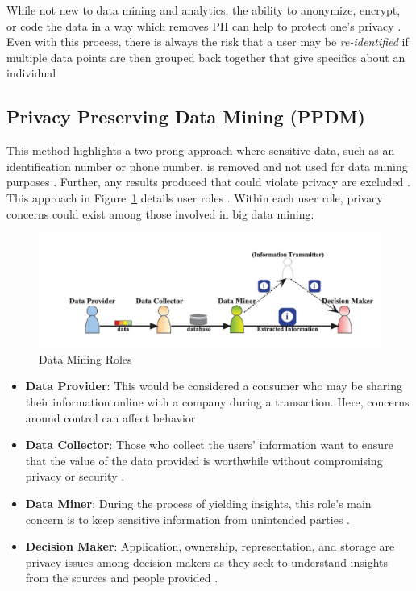 \documentclass[sigconf]{acmart}
\begin{document}
While not new to data mining and analytics, the ability to anonymize, encrypt, or code the data in a way which removes PII can help to protect one's privacy \cite{Tene2012}. Even with this process, there is always the risk that a user may be \textit{re-identified} if multiple data points are then grouped back together that give specifics about an individual \cite{Francis2014}

\subsection{Privacy Preserving Data Mining (PPDM)} 

This method highlights a two-prong approach where sensitive data, such as an identification number or phone number, is removed and not used for data mining purposes \cite{Xu2014}. Further, any results produced that could violate privacy are excluded \cite{Xu2014}. This approach in Figure~\ref{f:DataMiningRoles} details user roles \cite{Xu2014}. Within each user role, privacy concerns could exist among those involved in big data mining:

\begin{figure}[!htb]
  \centering\includegraphics[width=\textwidth]{roles.jpg}
  \caption{Data Mining Roles}
\label{f:DataMiningRoles}
\end{figure}

\begin{itemize}
 \item \textbf{Data Provider}: This would be considered a consumer who may be sharing their information online with a company during a transaction. Here, concerns around control can affect behavior \cite{Xu2014}
 \item \textbf{Data Collector}: Those who collect the users' information want to ensure that the value of the data provided is worthwhile without compromising privacy or security \cite{Xu2014}.
 \item \textbf{Data Miner}: During the process of yielding insights, this role's main concern is to keep sensitive information from unintended parties \cite{Xu2014}. 
 \item \textbf{Decision Maker}: Application, ownership, representation, and storage are privacy issues among decision makers as they seek to understand insights from the sources and people provided \cite{Xu2014}. 
 \end{itemize}
\end{document}

